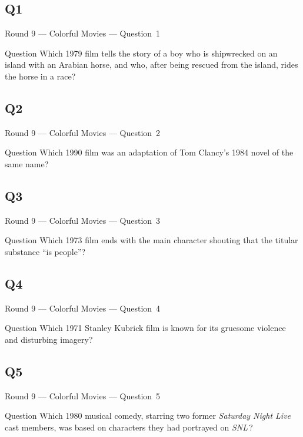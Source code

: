 \documentclass[11pt]{beamer}
\begin{document}
\subsection*{Q1}
\begin{frame}[t]{Round 9 --- Colorful Movies --- \mbox{Question 1}}
\vspace{-0.5em}
\begin{block}{Question}
Which 1979 film tells the story of a boy who is shipwrecked on an island with an Arabian horse, and who, after being rescued from the island, rides the horse in a race?
\end{block}
\end{frame}
\subsection*{Q2}
\begin{frame}[t]{Round 9 --- Colorful Movies --- \mbox{Question 2}}
\vspace{-0.5em}
\begin{block}{Question}
Which 1990 film was an adaptation of Tom Clancy's 1984 novel of the same name?
\end{block}
\end{frame}
\subsection*{Q3}
\begin{frame}[t]{Round 9 --- Colorful Movies --- \mbox{Question 3}}
\vspace{-0.5em}
\begin{block}{Question}
Which 1973 film ends with the main character shouting that the titular substance ``is people''?
\end{block}
\end{frame}
\subsection*{Q4}
\begin{frame}[t]{Round 9 --- Colorful Movies --- \mbox{Question 4}}
\vspace{-0.5em}
\begin{block}{Question}
Which 1971 Stanley Kubrick film is known for its gruesome violence and disturbing imagery?
\end{block}
\end{frame}
\subsection*{Q5}
\begin{frame}[t]{Round 9 --- Colorful Movies --- \mbox{Question 5}}
\vspace{-0.5em}
\begin{block}{Question}
Which 1980 musical comedy, starring two former \emph{Saturday Night Live} cast members, was based on characters they had portrayed on \emph{SNL}\,?
\end{block}
\end{frame}
\end{document}
